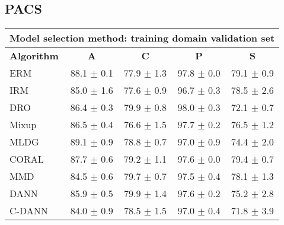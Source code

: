 \documentclass{article}
\begin{document}
\subsection{PACS}
\begin{center}
\begin{tabular}{lcccc}
\toprule
\multicolumn{5}{c}{\textbf{Model selection method: training domain validation set}} \\
\midrule
\textbf{Algorithm}    & \textbf{A}                & \textbf{C}                & \textbf{P}                & \textbf{S}                \\
\midrule
ERM                       & 88.1 $\pm$ 0.1            & 77.9 $\pm$ 1.3            & 97.8 $\pm$ 0.0            & 79.1 $\pm$ 0.9            \\
IRM                       & 85.0 $\pm$ 1.6            & 77.6 $\pm$ 0.9            & 96.7 $\pm$ 0.3            & 78.5 $\pm$ 2.6            \\
DRO                 & 86.4 $\pm$ 0.3            & 79.9 $\pm$ 0.8            & 98.0 $\pm$ 0.3            & 72.1 $\pm$ 0.7            \\
Mixup                     & 86.5 $\pm$ 0.4            & 76.6 $\pm$ 1.5            & 97.7 $\pm$ 0.2            & 76.5 $\pm$ 1.2            \\
MLDG                      & 89.1 $\pm$ 0.9            & 78.8 $\pm$ 0.7            & 97.0 $\pm$ 0.9            & 74.4 $\pm$ 2.0            \\
CORAL                     & 87.7 $\pm$ 0.6            & 79.2 $\pm$ 1.1            & 97.6 $\pm$ 0.0            & 79.4 $\pm$ 0.7            \\
MMD                       & 84.5 $\pm$ 0.6            & 79.7 $\pm$ 0.7            & 97.5 $\pm$ 0.4            & 78.1 $\pm$ 1.3            \\
DANN                       & 85.9 $\pm$ 0.5            & 79.9 $\pm$ 1.4            & 97.6 $\pm$ 0.2            & 75.2 $\pm$ 2.8            \\
C-DANN                   & 84.0 $\pm$ 0.9            & 78.5 $\pm$ 1.5            & 97.0 $\pm$ 0.4            & 71.8 $\pm$ 3.9            \\
\bottomrule
\end{tabular}
\end{center}
\end{document}
